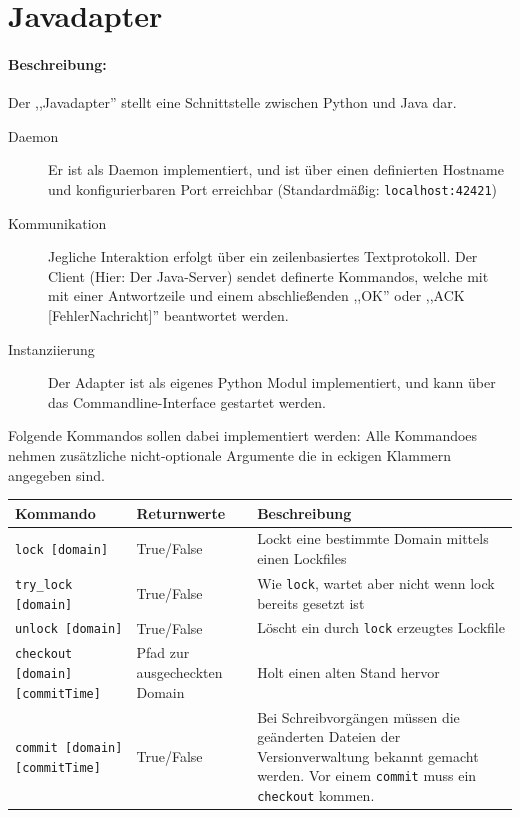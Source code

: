 \section{Javadapter} 
\label{sec:javadapter}
\paragraph{Beschreibung:}
\label{par:beschreibung_}
Der ,,Javadapter'' stellt eine Schnittstelle zwischen Python und Java dar.
\begin{description}
  \item [Daemon] Er ist als Daemon implementiert, und ist über einen
    definierten Hostname und konfigurierbaren Port erreichbar 
    (Standardmäßig: \texttt{localhost:42421})
  \item [Kommunikation] Jegliche Interaktion erfolgt über ein
    zeilenbasiertes Textprotokoll. Der Client (Hier: Der Java-Server)
    sendet definerte Kommandos, welche mit mit einer Antwortzeile
    und einem abschließenden ,,OK'' oder ,,ACK [FehlerNachricht]''
    beantwortet werden.
  \item [Instanziierung] Der Adapter ist als eigenes Python Modul
    implementiert, und kann über das Commandline-Interface gestartet
    werden.
\end{description}
 
Folgende Kommandos sollen dabei implementiert werden:
Alle Kommandoes nehmen zusätzliche nicht-optionale Argumente die in
eckigen Klammern angegeben sind.
\begin{table}[h]
  \begin{tabular}{|p{4cm}|p{5cm}|p{7cm}|}
    \hline
    \textbf{Kommando} & \textbf{Returnwerte} & \textbf{Beschreibung} \\
    \hline
    \texttt{lock [domain]} 
    & True/False 
    & Lockt eine bestimmte Domain mittels einen Lockfiles 
    \\
    \hline
    \texttt{try\_lock [domain]} 
    & True/False 
    & Wie \texttt{lock}, wartet aber nicht wenn lock bereits gesetzt ist 
    \\
    \hline
    \texttt{unlock [domain]} 
    & True/False 
    & Löscht ein durch \texttt{lock} erzeugtes Lockfile 
    \\
    \hline
    \texttt{checkout [domain] [commitTime]} 
    & Pfad zur ausgecheckten Domain
    & Holt einen alten Stand hervor
    \\
    \hline
    \texttt{commit [domain] [commitTime]} 
    & True/False 
    & Bei Schreibvorgängen müssen die geänderten Dateien
      der Versionverwaltung bekannt gemacht werden.
      Vor einem \texttt{commit} muss ein \texttt{checkout} kommen.
    \\
    \hline
  \end{tabular}
\end{table}

